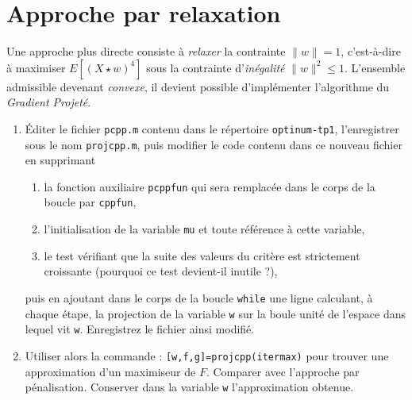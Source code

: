 \documentclass[10pt,a4paper,fleqn]{report}
\newcommand{\onit}{\begin{enumerate}}
\newcommand{\offit}{\end{enumerate}}
\renewcommand{\tt}{\texttt}
\begin{document}
\section{ Approche par relaxation}
Une approche plus directe consiste \`{a} \textit{relaxer} la contrainte $\| w\|=1$, c'est-\`{a}-dire \`{a} maximiser $E[(X\star w)^4]$ sous la contrainte d'\textit{in\'{e}galit\'{e}} $\| w \|^2 \leq 1$. L'ensemble admissible devenant \textit{convexe}, il devient possible d'impl\'{e}menter l'algorithme du \textit{Gradient Projet\'{e}}.
\onit
\item \'Editer le fichier \tt{pcpp.m} contenu dans le r\'{e}pertoire \tt{optinum-tp1}, l'enregistrer sous le nom \tt{projcpp.m}, puis modifier le code contenu dans ce nouveau fichier en supprimant
\onit
\item la fonction auxiliaire \tt{pcppfun} qui sera remplac\'{e}e dans le corps de la boucle par \tt{cppfun},
\item l'initialisation de la variable \tt{mu} et toute r\'{e}f\'{e}rence \`{a} cette variable,
\item le test v\'{e}rifiant que la suite des valeurs du crit\`{e}re est strictement croissante (pourquoi ce test devient-il inutile ?),
\offit
puis en ajoutant dans le corps de la boucle \tt{while} une ligne calculant, \`{a} chaque \'{e}tape, la projection de la variable \tt w sur la boule unit\'{e} de l'espace dans lequel vit \tt w. Enregistrez le fichier ainsi modifi\'{e}.
\item Utiliser alors la commande : \tt{[w,f,g]=projcpp(itermax)} pour trouver une approximation
d'un maximiseur de $F$. Comparer avec l'approche par p\'{e}nalisation. Conserver
dans la variable \tt  w l'approximation obtenue.
\offit
\end{document}
